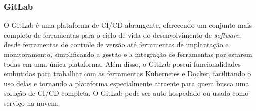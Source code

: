 
\subsubsection*{GitLab}
O GitLab é uma plataforma de CI/CD abrangente, oferecendo um conjunto mais completo de ferramentas para o ciclo de vida do desenvolvimento de \emph{software}, desde ferramentas de controle de versão até ferramentas de implantação e monitoramento, simplificando a gestão e a integração de ferramentas por estarem todas em uma única plataforma. Além disso, o GitLab possui funcionalidades embutidas para trabalhar com as ferramentas Kubernetes e Docker, facilitando o uso delas e tornando a plataforma especialmente atraente para quem busca uma solução de CI/CD completa. O GitLab pode ser auto-hospedado ou usado como serviço na nuvem.



